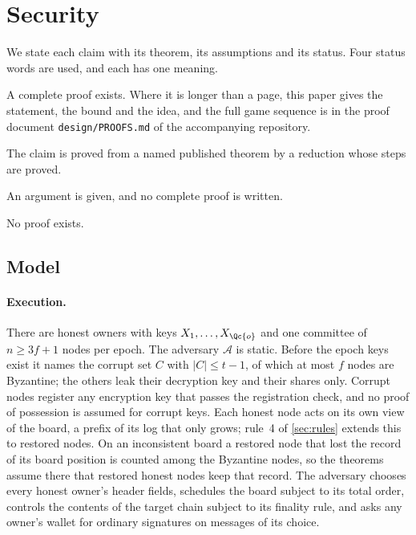 \section{Security}\label{sec:security}

We state each claim with its theorem, its assumptions and its status. Four status words are used, and each has one meaning.

\begin{description}[leftmargin=1.5em,itemsep=1pt]
\item[Proved.] A complete proof exists. Where it is longer than a page, this paper gives the statement, the bound and the idea, and the full game sequence is in the proof document \texttt{design/PROOFS.md} of the accompanying repository.
\item[Reduced.] The claim is proved from a named published theorem by a reduction whose steps are proved.
\item[Sketched.] An argument is given, and no complete proof is written.
\item[Open.] No proof exists.
\end{description}

\subsection{Model}\label{sec:model}

\paragraph{Execution.} There are honest owners with keys $X_1, \dots, X_{\Qc{o}}$ and one committee of $n \ge 3f+1$ nodes per epoch. The adversary $\mathcal{A}$ is static. Before the epoch keys exist it names the corrupt set $C$ with $|C| \le t-1$, of which at most $f$ nodes are Byzantine; the others leak their decryption key and their shares only. Corrupt nodes register any encryption key that passes the registration check, and no proof of possession is assumed for corrupt keys. Each honest node acts on its own view of the board, a prefix of its log that only grows; rule~4 of \cref{sec:rules} extends this to restored nodes. On an inconsistent board a restored node that lost the record of its board position is counted among the Byzantine nodes, so the theorems assume there that restored honest nodes keep that record. The adversary chooses every honest owner's header fields, schedules the board subject to its total order, controls the contents of the target chain subject to its finality rule, and asks any owner's wallet for ordinary signatures on messages of its choice.

